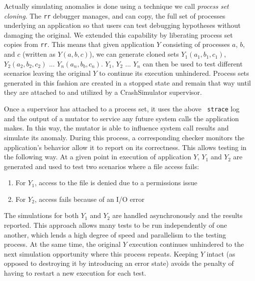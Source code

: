 Actually simulating anomalies
is done using
a technique
we call {\it process set cloning}.
The {\tt rr} debugger manages,
and can copy,
the full set of processes underlying an application
so that users can test debugging
hypotheses without damaging the original.
We extended this capability
by liberating process set copies from {\tt rr}.
This means that given application $Y$
consisting of processes $a$, $b$, and $c$
(written as $Y(a, b, c)$),
we can generate cloned sets $Y_1(a_1, b_1, c_1)$,
$Y_2(a_2, b_2, c_2)$ ... $Y_n(a_n, b_b, c_n)$.
$Y_1$, $Y_2$ ... $Y_n$ can then be used to test different scenarios leaving
the original $Y$ to continue its execution unhindered.
Process sets generated in this fashion are created in a stopped state and
remain that way until they are attached to and utilized by a CrashSimulator
supervisor.

Once a supervisor has attached to a process set, it uses the above {\tt
strace} log and the output of a mutator to service any future
system calls the application makes.  In this way, the mutator is able to
influence system call results and simulate its anomaly.
During this process,
a corresponding checker
monitors the application's behavior allow it to report on its correctness.
This allows testing in the following way.
At a given point in execution of application $Y$,
$Y_1$ and $Y_2$ are generated and
used to test two scenarios where a file access fails:
\begin{enumerate}
    \item{For $Y_1$, access to the file is denied due to a permissions issue}
    \item{For $Y_2$, access fails because of an I/O error}
\end{enumerate}
The simulations for both $Y_1$ and $Y_2$ are handled asynchronously and
the results reported.
This approach allows many tests to be run independently of one another,
which lends a
high degree of speed and
parallelism to the testing process.
At the same time, the original $Y$ execution continues unhindered to the
next simulation opportunity where this process repeats.
Keeping $Y$ intact
(as opposed to destroying it by introducing an error state)
avoids the penalty
of having to restart a new execution for each test.
